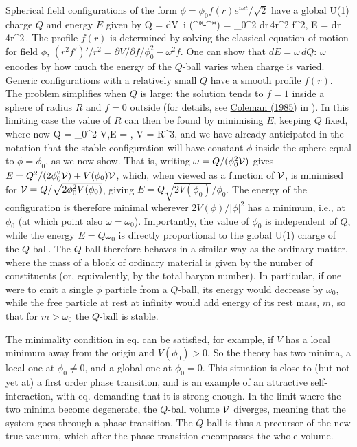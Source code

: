 Spherical field configurations of the form
$\phi = \phi_0 f(r) e^{i \omega t}/\sqrt{2}$
have a global U(1) charge $Q$ and energy $E$ given by
\beq Q = \int dV~i (\phi^*\dot\phi -\phi \dot\phi^*) = \omega \phi_0^2 \int dr\,4\pi r^2 f^2,\qquad
E = \int dr\,  4\pi r^2\,.
\eeq
The profile $f(r)$ is determined by solving the classical equation of motion for field $\phi$, 
$(r^2 f')'/r^2  = \partial V/\partial f/\phi_0^2 -  \omega^2 f$.
One can show that  $dE=\omega\, dQ$: $\omega$ encodes by how much the energy of the $Q$-ball varies when charge is varied.
Generic configurations with a relatively small $Q$ have a smooth profile $f(r)$.
The problem simplifies when $Q$ is large: the solution tends to $f = 1$ inside a sphere of radius $R$
and $f=0$ outside (for details, see \href{https://doi.org/10.1016/0550-3213(86)90520-1}{Coleman (1985)} in \cite{Qballs}). 
In this limiting case the value of $R$ can then be found by minimising $E$, keeping $Q$ fixed, where now
\beq 
Q = \omega \phi_0^2 {\cal V},\qquad E =  ,\qquad
{\cal V} = R^3,
\eeq
and we have already anticipated in the notation that the stable configuration will have constant $\phi$ inside the sphere equal to $\phi=\phi_0$, 
as we now show.
That is, writing $\omega=Q/(\phi_0^2 {\cal V})$  gives $E=Q^2/(2 \phi_0^2 {\cal V})+V(\phi_0){\cal V}$, which, 
when viewed as a function of ${\cal V}$, is minimised for ${\cal V} = Q/\sqrt{2\phi_0^2 V(\phi_0)}$, giving $E = Q\sqrt{2V(\phi_0)}/\phi_0$. 
The energy of the configuration is therefore minimal wherever $2V(\phi)/|\phi|^2$ has a minimum, i.e., at  $\phi_0$ (at which point also $\omega=\omega_0$). Importantly, the value of $\phi_0$ is independent of $Q$, while the energy $E=Q\omega_0$ is directly proportional to the global U(1) charge of the $Q$-ball. 
The $Q$-ball therefore behaves in a similar way as the ordinary matter, where the mass of a block of ordinary material is given by the number of constituents 
(or, equivalently, by the total baryon number). In particular, if one were to emit a single $\phi$ particle from a $Q$-ball, 
its energy would decrease by $\omega_0$, while the free particle at rest at infinity would add energy of its rest mass, $m$, 
so that for $m>\omega_0$ the $Q$-ball is stable. 
 


The minimality condition in eq. can be satisfied, for example, if $V$ has a local minimum 
away from the origin and $V(\phi_0) >0$. 
So the theory has two minima, a local one at $\phi_0\ne0$, and a global one at $\phi_0=0$. 
This situation is close to (but not yet at) a  first order phase transition, and is an example of an attractive self-interaction,
with eq. demanding that it is strong enough.
In the limit where the two minima become degenerate, the $Q$-ball volume ${\cal V}$ diverges,
meaning that the system goes through a phase transition.
The $Q$-ball is thus a precursor of the new true vacuum, which after the phase transition encompasses the whole volume. 

